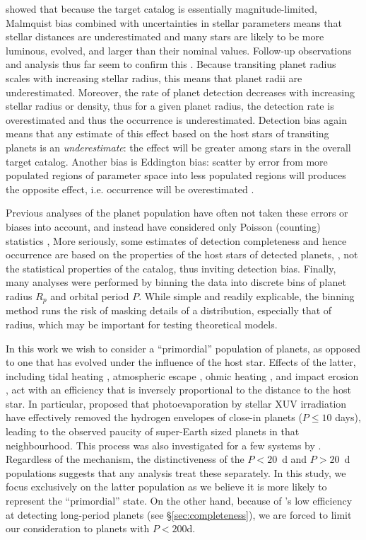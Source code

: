 \citet{GaidosMann2013} showed that because the \kep{} target catalog
is essentially magnitude-limited, Malmquist bias combined with
uncertainties in stellar parameters means that stellar distances are
underestimated and many stars are likely to be more luminous, evolved,
and larger than their nominal values.  Follow-up observations and
analysis thus far seem to confirm this
\citep[e.g.][]{Bastien2014,Everett2013,Verner2011}.  Because
transiting planet radius scales with increasing stellar radius, this means that
planet radii are underestimated.  Moreover, the rate of planet
detection decreases with increasing stellar radius or density, thus
for a given planet radius, the detection rate is overestimated and
thus the occurrence is underestimated.  Detection bias again means
that any estimate of this effect based on the host stars of transiting
planets is an {\it underestimate}: the effect will be greater among
stars in the overall target catalog.  Another bias is Eddington bias:
scatter by error from more populated regions of parameter space into
less populated regions will produces the opposite effect,
i.e. occurrence will be overestimated \citep{Gaidos2013}.

Previous analyses of the \kep{} planet population have often not taken
these errors or biases into account, and instead have considered only
Poisson (counting) statistics \citep[e.g.][]{Petigura2013,Howard2012},
More seriously, some estimates of detection completeness and hence
occurrence are based on the properties of the host stars of detected
planets, \citep[e.g.][]{Petigura2013}, not the statistical properties
of the catalog, thus inviting detection bias.  Finally, many analyses
were performed by binning the data into discrete bins of planet radius $R_p$
and orbital period $P$.  While simple and readily explicable, the binning
method runs the risk of masking details of a distribution, especially
that of radius, which may be important for testing theoretical
models.

In this work we wish to consider a ``primordial'' population of
planets, as opposed to one that has evolved under the influence of the
host star. Effects of the latter, including tidal heating
\citep{Jackson2008}, atmospheric escape \citep{Tian2005}, ohmic heating
\citep{Batygin2011}, and impact erosion \citep{Marcus2009}, act with
an efficiency that is inversely proportional to the distance to the
host star. In particular, \citet{Owen2013} proposed that
photoevaporation by stellar XUV irradiation have effectively removed
the hydrogen envelopes of close-in planets ($P \leq 10$ days), leading
to the observed paucity of super-Earth sized planets in that
neighbourhood.  This process was also investigated for a few \kep{}
systems by \citet{Lopez2012}. Regardless of the mechanism, the
distinctiveness of the $P< 20$~d and $P>20$~d populations \citep[see,
e.g.][]{Youdin} suggests that any analysis treat these separately.  In
this study, we focus exclusively on the latter population as we
believe it is more likely to represent the ``primordial'' state.  On
the other hand, because of \kep{}'s low efficiency at detecting
long-period planets (see \S \ref{sec:completeness}), we are forced to
limit our consideration to planets with $P<200$d.

